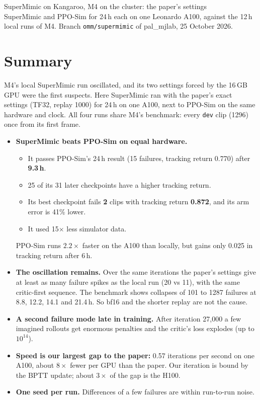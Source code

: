 \documentclass[10pt]{article}
\begin{document}
\sloppy

\begin{center}
{\LARGE SuperMimic on Kangaroo, M4 on the cluster: the paper's settings}\\[4pt]
SuperMimic and PPO-Sim for 24\,h each on one Leonardo A100, against the 12\,h local runs of M4.
Branch \texttt{omm/supermimic} of pal\_mjlab, 25 October 2026.
\end{center}

\section*{Summary}

M4's local SuperMimic run oscillated, and its two settings forced by the 16\,GB GPU were the first
suspects. Here SuperMimic ran with the paper's exact settings (TF32, replay 1000) for 24\,h on one A100,
next to PPO-Sim on the same hardware and clock. All four runs share M4's benchmark: every
\texttt{dev} clip (1296) once from its first frame.

\begin{itemize}
  \item \textbf{SuperMimic beats PPO-Sim on equal hardware.}
  \begin{itemize}
    \item It passes PPO-Sim's 24\,h result (15 failures, tracking return 0.770) after \textbf{9.3\,h}.
    \item 25 of its 31 later checkpoints have a higher tracking return.
    \item Its best checkpoint fails \textbf{2} clips with tracking return \textbf{0.872}, and its arm error is
    41\% lower.
    \item It used 15$\times$ less simulator data.
  \end{itemize}
  PPO-Sim runs $2.2\times$ faster on the A100 than locally, but gains only 0.025 in tracking return
  after 6\,h.
  \item \textbf{The oscillation remains.} Over the same iterations the paper's settings give at least as
  many failure spikes as the local run (20 vs 11), with the same critic-first sequence. The benchmark shows collapses of
  101 to 1287 failures at 8.8, 12.2, 14.1 and 21.4\,h. So bf16 and the shorter replay are not
  the cause.
  \item \textbf{A second failure mode late in training.} After iteration 27,000 a few imagined rollouts
  get enormous penalties and the critic's loss explodes (up to $10^{14}$).
  \item \textbf{Speed is our largest gap to the paper:} 0.57 iterations per second on one A100, about
  $8\times$ fewer per GPU than the paper. Our iteration is bound by the BPTT update; about $3\times$ of
  the gap is the H100.
  \item \textbf{One seed per run.} Differences of a few failures are within run-to-run noise.
\end{itemize}
\end{document}
